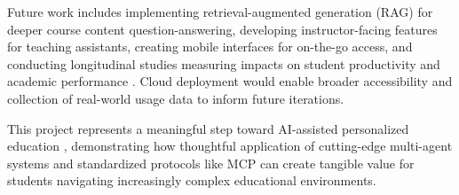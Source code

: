 \documentclass{article}
\begin{document}
Future work includes implementing retrieval-augmented generation (RAG) for deeper course content question-answering, developing instructor-facing features for teaching assistants, creating mobile interfaces for on-the-go access, and conducting longitudinal studies measuring impacts on student productivity and academic performance \cite{teachable2025agents, education2025agentic}. Cloud deployment would enable broader accessibility and collection of real-world usage data to inform future iterations.

This project represents a meaningful step toward AI-assisted personalized education \cite{genai2024higher, lms2025ai}, demonstrating how thoughtful application of cutting-edge multi-agent systems \cite{llmmas2025software} and standardized protocols like MCP \cite{mcp2025landscape} can create tangible value for students navigating increasingly complex educational environments.




\appendix
\end{document}
